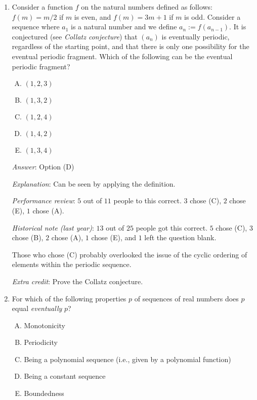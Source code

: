 \documentclass[10pt]{amsart}
\begin{document}
\begin{enumerate}
  {\em Action point}: After understanding the solution, you should not
  forget the idea!

\item Consider a function $f$ on the natural numbers defined as
  follows: $f(m) = m/2$ if $m$ is even, and $f(m) = 3m + 1$ if $m$ is
  odd. Consider a sequence where $a_1$ is a natural number and we
  define $a_n := f(a_{n-1})$. It is conjectured (see {\em Collatz
  conjecture}) that $(a_n)$ is eventually periodic, regardless of the
  starting point, and that there is only one possibility for the
  eventual periodic fragment. Which of the following can be the
  eventual periodic fragment?

  \begin{enumerate}[(A)]
  \item $(1,2,3)$
  \item $(1,3,2)$
  \item $(1,2,4)$
  \item $(1,4,2)$
  \item $(1,3,4)$
  \end{enumerate}

  {\em Answer}: Option (D)

  {\em Explanation}: Can be seen by applying the definition.

  {\em Performance review}: $5$ out of $11$ people to this
  correct. $3$ chose (C), $2$ chose (E), $1$ chose (A).

  {\em Historical note (last year)}: $13$ out
  of $25$ people got this correct. $5$ chose (C), $3$ chose (B), $2$
  chose (A), $1$ chose (E), and $1$ left the question blank.

  Those who chose (C) probably overlooked the issue of the cyclic
  ordering of elements within the periodic sequence.

  {\em Extra credit}: Prove the Collatz conjecture.

\item For which of the following properties $p$ of sequences of real
  numbers does $p$ equal {\em eventually} $p$?
  \begin{enumerate}[(A)]
  \item Monotonicity
  \item Periodicity
  \item Being a polynomial sequence (i.e., given by a polynomial function)
  \item Being a constant sequence
  \item Boundedness
  \end{enumerate}


\end{enumerate}
\end{document}

